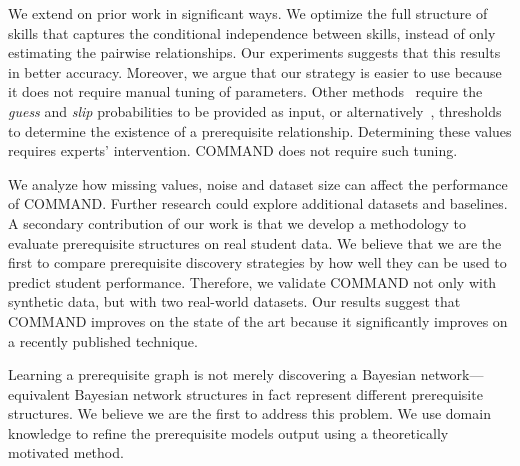 \documentclass{edm_template}
\begin{document}
    We  extend  on prior work in significant ways.
	We optimize the full structure of skills that captures the conditional independence between skills, instead of only estimating the pairwise relationships.
	Our experiments suggests that this results in better accuracy.
	Moreover, we argue that our strategy is  easier to use %
        because  it does not require  manual tuning of  parameters.
	Other methods~\cite{brunskill2010estimating} require the  \emph{guess} and \emph{slip} probabilities to be  provided as input,
	or alternatively~\cite{chen2015discovering},  thresholds to determine the existence of a prerequisite relationship.
	Determining these values requires experts' intervention. 
	COMMAND does not require such tuning.
	
	We analyze how missing values, noise and dataset size can affect the performance of COMMAND.
	Further research could explore additional datasets and baselines.
	A secondary contribution of our work is that we develop a methodology to evaluate  prerequisite structures on real student data.
	We believe that we are the first to compare prerequisite discovery strategies by how well they can be used to predict student performance.
	Therefore, we validate COMMAND not only with synthetic data, but with two real-world datasets.
	Our results suggest that COMMAND improves on the state of the art  because it significantly improves on a recently published technique.
	
	
	Learning a prerequisite graph is not merely discovering a Bayesian network--- 
	   equivalent Bayesian network structures  in fact represent different prerequisite structures.
       We believe we are the first to address this problem.
       We use domain knowledge to refine the prerequisite models output using a theoretically motivated method.
	
\end{document}

